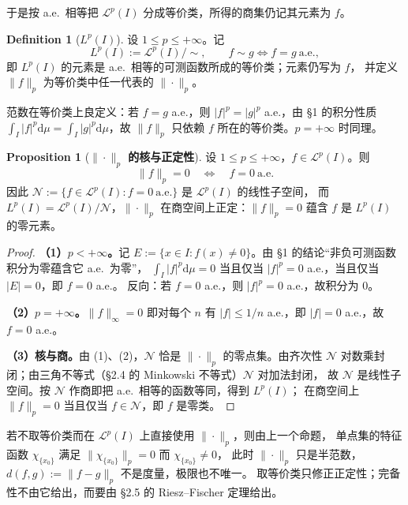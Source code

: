 \documentclass[oneside]{book}
\theoremstyle{definition}
\newcommand{\dd}{\mathrm{d}}
\theoremstyle{definition}
\newtheorem{proposition}{Proposition}[section]
\newtheorem{definition}{Definition}[section]
\begin{document}
	于是按 a.e.\ 相等把 $\mathcal L^p(I)$ 分成等价类，所得的商集仍记其元素为 $f$。
	
	\begin{definition}[\bfseries{$L^p(I)$}]
		设 $1\leqslant p\leqslant+\infty$。记
		\[
		L^p(I):=\mathcal L^p(I)\big/\sim,\qquad f\sim g\iff f=g\ \text{a.e.},
		\]
		即 $L^p(I)$ 的元素是 a.e.\ 相等的可测函数所成的等价类；元素仍写为 $f$，
		并定义 $\|f\|_p$ 为等价类中任一代表的 $\|\cdot\|_p$。
	\end{definition}
	
	范数在等价类上良定义：若 $f=g$ a.e.，则 $|f|^p=|g|^p$ a.e.，由 §1 的积分性质
	$\int_I|f|^p\dd\mu=\int_I|g|^p\dd\mu$，故 $\|f\|_p$ 只依赖 $f$ 所在的等价类。$p=+\infty$ 时同理。
	
	\begin{proposition}[\bfseries{$\|\cdot\|_p$ 的核与正定性}]
		设 $1\leqslant p\leqslant+\infty$，$f\in\mathcal L^p(I)$。则
		\[
		\|f\|_p=0\quad\Longleftrightarrow\quad f=0\ \text{a.e.}
		\]
		因此 $\mathcal N:=\{f\in\mathcal L^p(I): f=0\ \text{a.e.}\}$ 是 $\mathcal L^p(I)$ 的线性子空间，
		而 $L^p(I)=\mathcal L^p(I)/\mathcal N$，$\|\cdot\|_p$ 在商空间上正定：$\|f\|_p=0$ 蕴含 $f$ 是 $L^p(I)$ 的零元素。
	\end{proposition}
	
	\begin{proof}
		\textbf{（1）$p<+\infty$。}记 $E:=\{x\in I: f(x)\ne0\}$。由 §1 的结论“非负可测函数积分为零蕴含它 a.e.\ 为零”，
		$\int_I|f|^p\dd\mu=0$ 当且仅当 $|f|^p=0$ a.e.，当且仅当 $|E|=0$，即 $f=0$ a.e.。
		反向：若 $f=0$ a.e.，则 $|f|^p=0$ a.e.，故积分为 $0$。
		
		\textbf{（2）$p=+\infty$。}$\|f\|_\infty=0$ 即对每个 $n$ 有 $|f|\leqslant1/n$ a.e.，即 $|f|=0$ a.e.，故 $f=0$ a.e.。
		
		\textbf{（3）核与商。}由 (1)、(2)，$\mathcal N$ 恰是 $\|\cdot\|_p$ 的零点集。由齐次性
		$\mathcal N$ 对数乘封闭；由三角不等式（§2.4 的 Minkowski 不等式）$\mathcal N$ 对加法封闭，
		故 $\mathcal N$ 是线性子空间。按 $\mathcal N$ 作商即把 a.e.\ 相等的函数等同，得到 $L^p(I)$；
		在商空间上 $\|f\|_p=0$ 当且仅当 $f\in\mathcal N$，即 $f$ 是零类。
	\end{proof}
	
	若不取等价类而在 $\mathcal L^p(I)$ 上直接使用 $\|\cdot\|_p$，则由上一个命题，
	单点集的特征函数 $\chi_{\{x_0\}}$ 满足 $\|\chi_{\{x_0\}}\|_p=0$ 而 $\chi_{\{x_0\}}\ne0$，
	此时 $\|\cdot\|_p$ 只是半范数，$d(f,g):=\|f-g\|_p$ 不是度量，极限也不唯一。
	取等价类只修正正定性；完备性不由它给出，而要由 §2.5 的 Riesz--Fischer 定理给出。
	
\end{document}
